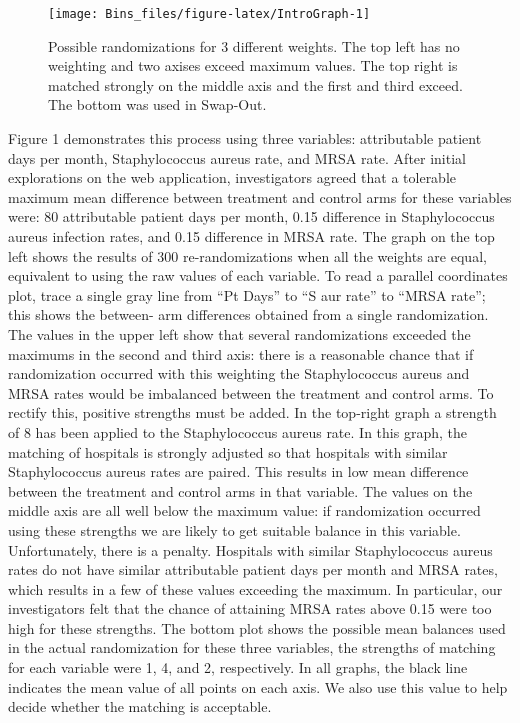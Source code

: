 \documentclass[]{article}
\begin{document}
\begin{figure}

{\centering \texttt{[image: Bins\_files/figure-latex/IntroGraph-1]} 

}

\caption{Possible randomizations for 3 different weights. The top left has no weighting and two axises exceed maximum values. The top right is matched strongly on the middle axis and the first and third exceed. The bottom was used in Swap-Out.}\label{fig:IntroGraph}
\end{figure}

Figure 1 demonstrates this process using three variables: attributable
patient days per month, Staphylococcus aureus rate, and MRSA rate. After
initial explorations on the web application, investigators agreed that a
tolerable maximum mean difference between treatment and control arms for
these variables were: 80 attributable patient days per month, 0.15
difference in Staphylococcus aureus infection rates, and 0.15 difference
in MRSA rate. The graph on the top left shows the results of 300
re-randomizations when all the weights are equal, equivalent to using
the raw values of each variable. To read a parallel coordinates plot,
trace a single gray line from ``Pt Days'' to ``S aur rate'' to ``MRSA
rate''; this shows the between- arm differences obtained from a single
randomization. The values in the upper left show that several
randomizations exceeded the maximums in the second and third axis: there
is a reasonable chance that if randomization occurred with this
weighting the Staphylococcus aureus and MRSA rates would be imbalanced
between the treatment and control arms. To rectify this, positive
strengths must be added. In the top-right graph a strength of 8 has been
applied to the Staphylococcus aureus rate. In this graph, the matching
of hospitals is strongly adjusted so that hospitals with similar
Staphylococcus aureus rates are paired. This results in low mean
difference between the treatment and control arms in that variable. The
values on the middle axis are all well below the maximum value: if
randomization occurred using these strengths we are likely to get
suitable balance in this variable. Unfortunately, there is a penalty.
Hospitals with similar Staphylococcus aureus rates do not have similar
attributable patient days per month and MRSA rates, which results in a
few of these values exceeding the maximum. In particular, our
investigators felt that the chance of attaining MRSA rates above 0.15
were too high for these strengths. The bottom plot shows the possible
mean balances used in the actual randomization for these three
variables, the strengths of matching for each variable were 1, 4, and 2,
respectively. In all graphs, the black line indicates the mean value of
all points on each axis. We also use this value to help decide whether
the matching is acceptable.
\end{document}
